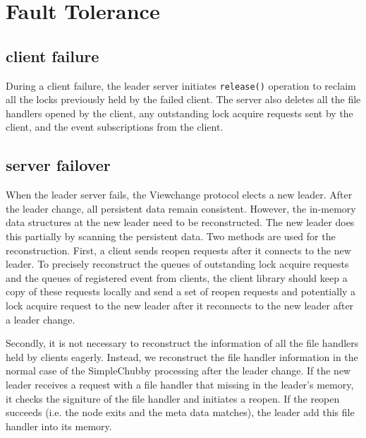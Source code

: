 \section{Fault Tolerance}
\label{section:failure}

\subsection{client failure}

During a client failure, the leader server initiates \texttt{release()} operation
to reclaim all the locks previously held by the failed client. 
The server also deletes all the file handlers opened by the client,
any outstanding lock acquire requests sent by the client, and the
event subscriptions from the client.


\subsection{server failover}

When the leader server fails, the Viewchange protocol elects a new leader. After
the leader change, all persistent data remain consistent. However, the in-memory
data structures at the new leader need to be reconstructed. The new leader
does this partially by scanning the persistent data. 
Two methods are used for the reconstruction.
First, a client sends reopen requests after it connects to the new leader.
To precisely reconstruct the queues of outstanding lock acquire requests and
the queues of registered event from clients, the client library should keep
a copy of these requests locally and send a set of reopen requests and
potentially a lock acquire request to the new leader after it reconnects
to the new leader after a leader change.

Secondly, it is not necessary to reconstruct the information of all the file
handlers held by clients eagerly. Instead, we reconstruct the file handler
information in the normal case of the SimpleChubby processing after the
leader change. If the new leader receives a request with a file handler that
missing in the leader's memory, it checks the signiture of the file
handler and initiates a reopen. If the reopen succeeds (i.e. the node exits
and the meta data matches), the leader add this file handler into its memory.
